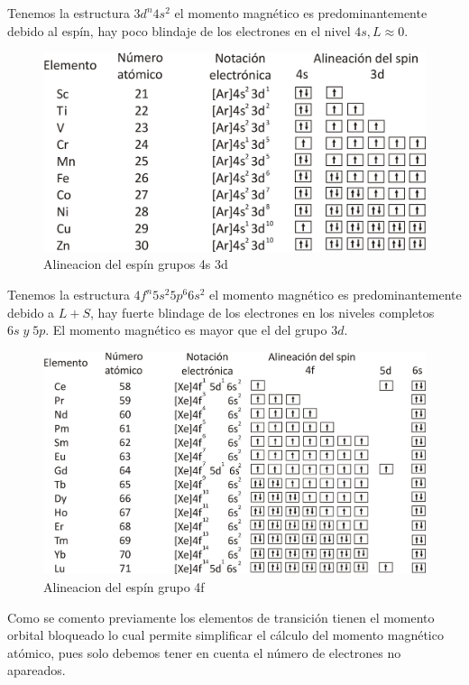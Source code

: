 Tenemos la estructura $3d^{n} 4s^{2}$ el momento magnético es predominantemente debido al espín, hay poco blindaje de los electrones en el nivel $4s, L\approx0$.


\begin{figure}[H]
    \centering
    \includegraphics[width=1.0\textwidth]{./Figures/AlineacionDelEspin2}
	\caption{Alineacion del espín grupos 4s 3d}
	\label{fig:AlineacionDelEspin2}
\end{figure}

Tenemos la estructura $4f^{n} 5s^{2} 5p^{6} 6s^{2}$ el momento magnético es predominantemente debido a $L+S$, hay
fuerte blindage de los electrones en los niveles completos $6s\; y\; 5p$. El momento magnético es mayor que el
del grupo $3d$.

\begin{figure}[H]
    \centering
    \includegraphics[width=1.0\textwidth]{./Figures/AlineacionDelEspin3grupo4f}
	\caption{Alineacion del espín grupo 4f}
	\label{fig:AlineacionDelEspin3grupo4f}
\end{figure}

Como se comento previamente los elementos de transición tienen el momento orbital bloqueado lo cual permite simplificar el cálculo del momento magnético atómico, pues solo debemos tener en cuenta el número de electrones no apareados.

